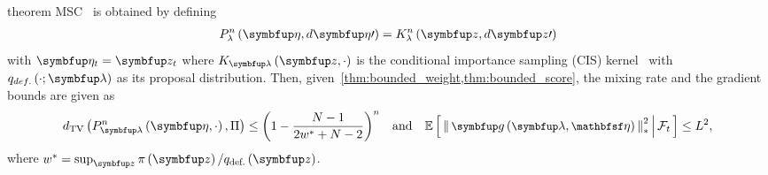 
\begin{theoremEnd}{theorem}\label{thm:msc}
  MSC~\citep{NEURIPS2020_b2070693} is obtained by defining 
  {%
  \begin{align*}
  P_{\lambda}^n\left(\veta, d\veta\prime\right)
  = 
  K_{\lambda}^n\left(\vz, d\vz\prime\right)
  \end{align*}
  }
  with  \(\veta_t = \vz_t\) where \(K_{\vlambda}\left(\vz, \cdot\right)\) is the conditional importance sampling (CIS) kernel~\citep{NEURIPS2020_b2070693} with \(q_{def.}\left(\cdot; \vlambda\right)\) as its proposal distribution.
  Then, given~\cref{thm:bounded_weight,thm:bounded_score}, the mixing rate and the gradient bounds are given as
  {\small
  \begin{align*}
  \DTV{P_{\vlambda}^n\left(\veta, \cdot\right)}{\Pi} \leq  {\left(1 - \frac{N - 1}{2 w^* + N - 2}\right)}^n\quad \text{and}\quad
  {\small
  \E{ \norm{ \vg\left(\vlambda, \rvveta\right) }_{*}^2 \,\middle|\, \mathcal{F}_{t} } \leq  L^2,
  }
  \end{align*}
  }
  where \(w^* = \sup_{\vz} \pi\left(\vz\right) / q_{\text{def.}}\left(\vz\right)\).
\end{theoremEnd}
